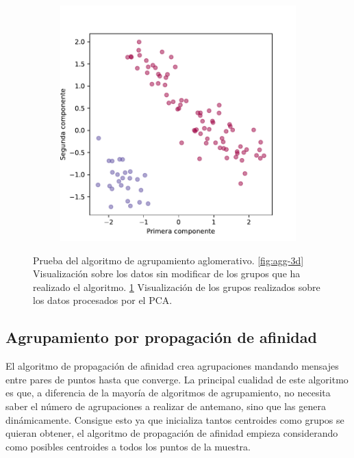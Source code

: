 \begin{figure}[h]
\begin{subfigure}{0.45\textwidth}
    \includegraphics[width=\textwidth]{figures/aglomerative-pca.pdf}
    \caption{}
    \label{fig:agg-pca}
  \end{subfigure}
  \caption[Prueba del algoritmo de agrupamiento aglomerativo.]{Prueba del algoritmo de agrupamiento aglomerativo. \ref{fig:agg-3d} Visualización sobre los datos sin modificar de los grupos que ha realizado el algoritmo. \ref{fig:agg-pca} Visualización de los grupos realizados sobre los datos procesados por el PCA.}
  \label{fig:agglomerative}
\end{figure}

\newpage
\subsection{Agrupamiento por propagación de afinidad}

El algoritmo de propagación de afinidad \cite{affinity} crea agrupaciones mandando mensajes entre pares de puntos hasta que converge. La principal cualidad de este algoritmo es que, a diferencia de la mayoría de algoritmos de agrupamiento, no necesita saber el número de agrupaciones a realizar de antemano, sino que las genera dinámicamente. Consigue esto ya que inicializa tantos centroides como grupos se quieran obtener, el algoritmo de propagación de afinidad empieza considerando como posibles centroides a todos los puntos de la muestra.

